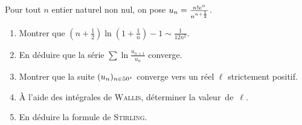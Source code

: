 \begin{exercice}
Pour tout $n$ entier naturel non nul, on pose $u_n = \frac{n! \mathrm{e}^n}{n^{n + \frac{1}{2}}}$.
\begin{enumerate}
\item Montrer que $\left(n + \frac{1}{2}\right) \ln\mathopen{}\left(1 + \frac{1}{n}\right) - 1\sim \frac{1}{12 n^2}$.

\item En déduire que la série $\sum \ln \frac{u_{n+1}}{u_n}$ converge.

\item Montrer que la suite $(u_n)_{n\in50^\star}$ converge vers un réel $\ell$ strictement positif.

\item À l'aide des intégrales de \textsc{Wallis}, déterminer la valeur~de~$\ell$.

\item En déduire la formule de \textsc{Stirling}.
\end{enumerate}
\end{exercice}

